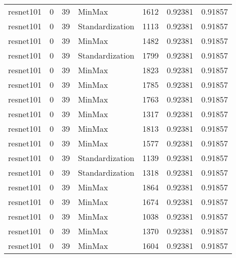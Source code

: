 \begin{tabular}{lrrlrrr}
 resnet101          &             0 &            39 & MinMax          &       1612 &          0.92381 &    0.91857 \\
 resnet101          &             0 &            39 & Standardization &       1113 &          0.92381 &    0.91857 \\
 resnet101          &             0 &            39 & MinMax          &       1482 &          0.92381 &    0.91857 \\
 resnet101          &             0 &            39 & Standardization &       1799 &          0.92381 &    0.91857 \\
 resnet101          &             0 &            39 & MinMax          &       1823 &          0.92381 &    0.91857 \\
 resnet101          &             0 &            39 & MinMax          &       1785 &          0.92381 &    0.91857 \\
 resnet101          &             0 &            39 & MinMax          &       1763 &          0.92381 &    0.91857 \\
 resnet101          &             0 &            39 & MinMax          &       1317 &          0.92381 &    0.91857 \\
 resnet101          &             0 &            39 & MinMax          &       1813 &          0.92381 &    0.91857 \\
 resnet101          &             0 &            39 & MinMax          &       1577 &          0.92381 &    0.91857 \\
 resnet101          &             0 &            39 & Standardization &       1139 &          0.92381 &    0.91857 \\
 resnet101          &             0 &            39 & Standardization &       1318 &          0.92381 &    0.91857 \\
 resnet101          &             0 &            39 & MinMax          &       1864 &          0.92381 &    0.91857 \\
 resnet101          &             0 &            39 & MinMax          &       1674 &          0.92381 &    0.91857 \\
 resnet101          &             0 &            39 & MinMax          &       1038 &          0.92381 &    0.91857 \\
 resnet101          &             0 &            39 & MinMax          &       1370 &          0.92381 &    0.91857 \\
 resnet101          &             0 &            39 & MinMax          &       1604 &          0.92381 &    0.91857 \\

\end{tabular}
